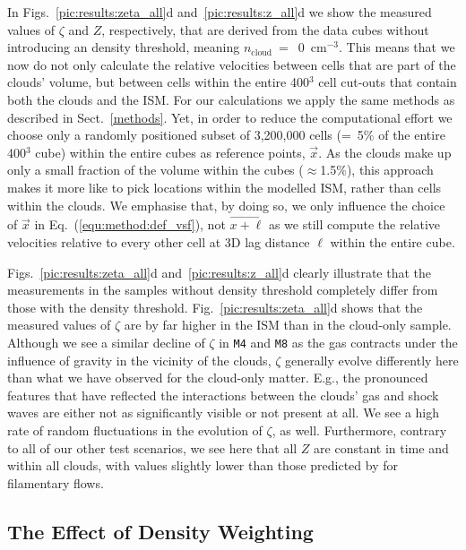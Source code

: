In Figs.~\ref{pic:results:zeta_all}d and~\ref{pic:results:z_all}d we show the measured values of $\zeta$ and $Z$, respectively, that are derived from the data cubes without introducing an density threshold, meaning $n_\mathrm{cloud}~=$~0~cm$^{-3}$.
This means that we now do not only calculate the relative velocities between cells that are part of the clouds' volume, but between cells within the entire 400$^3$ cell cut-outs that contain both the clouds and the ISM.
For our calculations we apply the same methods as described in Sect.~\ref{methods}. 
Yet, in order to reduce the computational effort we choose only a randomly positioned subset of 3,200,000 cells (=~5\% of the entire 400$^3$ cube) within the entire cubes as reference points, $\vec{x}$. 
As the clouds make up only a small fraction of the volume within the cubes ($\approx$1.5\%), this approach makes it more like to pick locations within the modelled ISM, rather than cells within the clouds. 
We emphasise that, by doing so, we only influence the choice of $\vec{x}$ in Eq.~(\ref{equ:method:def_vsf}), not $\vec{x+\ell}$ as we still compute the relative velocities relative to every other cell at 3D lag distance $\ell$ within the entire cube. 

Figs.~\ref{pic:results:zeta_all}d and~\ref{pic:results:z_all}d clearly illustrate that the measurements in the samples without density threshold completely differ from those with the density threshold.
Fig.~\ref{pic:results:zeta_all}d shows that the measured values of $\zeta$ are by far higher in the ISM than in the cloud-only sample.
Although we see a similar decline of $\zeta$ in \texttt{M4} and \texttt{M8} as the gas contracts under the influence of gravity in the vicinity of the clouds, $\zeta$ generally evolve differently here than what we have observed for the cloud-only matter.
E.g., the pronounced features that have reflected the interactions between the clouds' gas and shock waves are either not as significantly visible or not present at all.
We see a high rate of random fluctuations in the evolution of $\zeta$, as well.
Furthermore, contrary to all of our other test scenarios, we see here that all $Z$ are constant in time and within all clouds, with values slightly lower than those predicted by \citet{She1994} for filamentary flows.


\subsection{The Effect of Density Weighting}\label{results:densweight}

